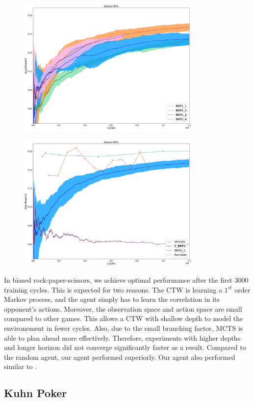 \documentclass{article}
\theoremstyle{definition}
\newtheorem{primary statistics}[definition]{Primary Statistics}
\newtheorem{auxiliary statistics}[definition]{Auxiliary Statistics}
\begin{document}
 \begin{figure}[h]
 \centering
    \includegraphics[width=9.1cm]{4_Biased_RPS}
\end{figure}

\begin{figure}[h]
\centering
    \includegraphics[width=9.1cm]{Biased_RPS}
\end{figure}

 In biased rock-paper-scissors, we achieve optimal performance after the first 3000 training cycles. This is expected for two reasons. The CTW is learning a $1^{st}$ order Markov process, and the agent simply has to learn the correlation in its opponent’s actions. Moreover, the observation space and action space are small compared to other games. This allows a CTW with shallow depth to model the environement in fewer cycles. Also, due to the small branching factor, MCTS is able to plan ahead more effectively. Therefore, experiments with higher depths and longer horizon did not converge significantly faster as a result. Compared to the random agent, our agent performed superiorly. Our agent also performed similar to \cite{veness2011monte}.

\subsection{Kuhn Poker}
\end{document}
